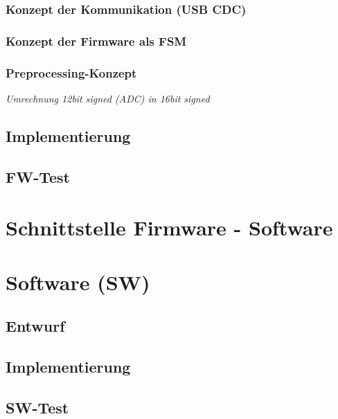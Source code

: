 \documentclass[a4paper, portrait, 12pt]{scrartcl} %
\begin{document}
\pagebreak

\subsubsection{Konzept der Kommunikation (USB CDC)}

\pagebreak

\subsubsection{Konzept der Firmware als FSM}

\pagebreak


\subsubsection{Preprocessing-Konzept}

\emph{Umrechnung 12bit signed (ADC) in 16bit signed}

\subsection{Implementierung}

\pagebreak

\subsection{FW-Test}

\pagebreak

\section{Schnittstelle Firmware - Software}

\pagebreak

\section{Software (SW)}
\subsection{Entwurf}

\pagebreak
\subsection{Implementierung}

\pagebreak

\subsection{SW-Test}
\end{document}
